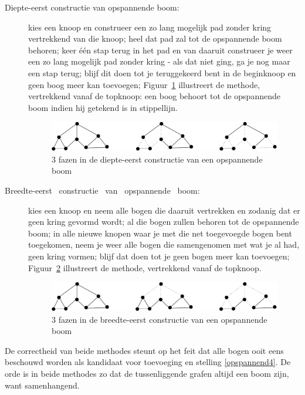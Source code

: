 \begin{description}
\item[Diepte-eerst constructie van opspannende boom:] kies een knoop
en construeer een zo lang mogelijk pad zonder kring vertrekkend van
die knoop; heel dat pad zal tot de opspannende boom behoren; keer
\'{e}\'{e}n stap terug in het pad en van daaruit construeer je weer
een zo lang mogelijk pad zonder kring - als dat niet ging, ga je nog
maar een stap terug; blijf dit doen tot je teruggekeerd bent in de
beginknoop en geen boog meer kan toevoegen; Figuur~\ref{diepteeerst1}
illustreert de methode, vertrekkend vanaf de topknoop: 
een boog behoort tot de opspannende boom indien hij getekend is in stippellijn.
\begin{figure}[ht]
\begin{center}
\includegraphics[width=0.6\linewidth,keepaspectratio]{diepteeerst1}
\end{center}
\caption{3 fazen in de diepte-eerst constructie van een opspannende boom \label{diepteeerst1}}
\end{figure}

\item[Breedte-eerst \ constructie \ van \ opspannende \ boom:] 
kies een knoop en 
neem alle bogen die daaruit vertrekken en zodanig
dat er geen kring gevormd wordt; al die bogen zullen behoren tot de
opspannende boom; in alle nieuwe knopen waar je met die net
toegevoegde bogen bent toegekomen, neem je weer alle bogen die
samengenomen met wat je al had, geen kring vormen; blijf dat doen tot
je geen bogen meer kan toevoegen; Figuur~\ref{breedteeerst1}
illustreert de methode, vertrekkend vanaf de topknoop.

\begin{figure}[ht]
\begin{center}
\includegraphics[width=0.6\linewidth,keepaspectratio]{breedteeerst1}
\end{center}
\caption{3 fazen in de breedte-eerst constructie van een opspannende boom \label{breedteeerst1}}
\end{figure}
\end{description}

De correctheid van beide methodes steunt op het feit dat alle bogen
ooit eens beschouwd worden als kandidaat voor toevoeging en stelling
\ref{opspannend4}. De orde is in beide methodes zo dat de
tussenliggende grafen altijd een boom zijn, want samenhangend.

